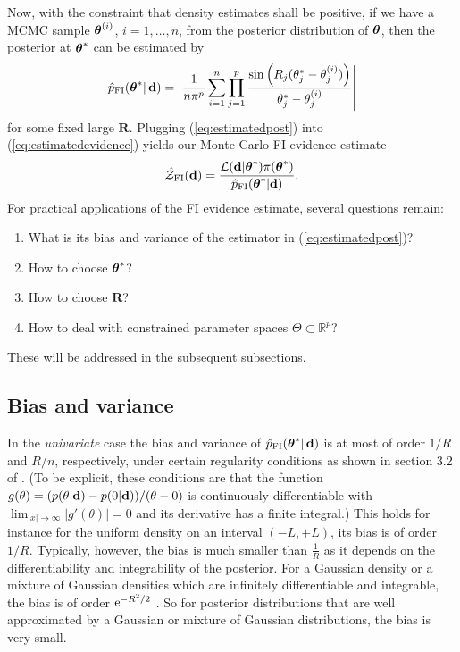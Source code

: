 \documentclass[%
 reprint,
 amsmath,amssymb,
 aps,
]{revtex4-2}
\def\R{\mathbb{R}}
\def\Rbold{\mathbf{R}}
\renewcommand{\d}{{\bf d}}
\newcommand{\btheta}{\mbox{\boldmath $\theta$}}
\newcommand{\e}{{\rm e}}
\begin{document}
Now, with the constraint that density estimates shall be positive, if we have a MCMC sample $\btheta^{(i)}$, $i=1,\ldots,n$, from the posterior distribution of $\btheta$, then the posterior at $\btheta^*$ can be estimated by
\begin{equation}\label{eq:estimatedpost}
\hat{p}_\text{FI}(\btheta^*|\,\d)=\left|\frac{1}{n\pi^p} \sum_{i=1}^n \prod_{j=1}^p\frac{\sin\left(R_j(\theta_j^*-\theta_j^{(i)}) \right)}{\theta_j^*-\theta_j^{(i)}}\right|
\end{equation}
for some fixed large $\Rbold$.
Plugging (\ref{eq:estimatedpost}) into (\ref{eq:estimatedevidence}) yields our Monte Carlo FI evidence estimate
\begin{equation}\label{eq:FIevidence}
 \hat{\mathcal{Z}}_\text{FI}(\d) = \frac{\mathcal{L}(\d|\btheta^*)
 \pi(\btheta^*)}{\hat{p}_\text{FI}(\btheta^*|\d)}.
 \end{equation}
For practical applications of the FI evidence estimate, several questions remain:
\begin{enumerate}
     \item What is its bias and variance of the estimator in (\ref{eq:estimatedpost})?
    \item How to choose $\btheta^*$?
    \item How to choose $\Rbold$?
    \item How to deal with constrained parameter spaces $\Theta \subset \R^p$?
\end{enumerate}
These will be addressed in the subsequent subsections.


\subsection{\label{subsec:FI bias and variance} Bias and variance}
%
 In the {\em univariate} case the bias and variance of $\hat{p}_\text{FI}(\btheta^*|\,\d)$ is at most of order $1/R$ and  $R/n$, respectively, under certain regularity conditions as shown in section 3.2 of \cite{rotiroti2022computing}. (To be explicit, these conditions are that the function $g(\theta)=(p(\theta|\d)-p(0|\d))/(\theta-0)$ is continuously differentiable with $\lim_{|x|\rightarrow \infty} |g'(\theta)|=0$ and its derivative has a finite integral.) This holds for instance for the uniform density on an interval $(-L,+L)$, its bias is of order $1/R$.
Typically, however,  the bias is much smaller than $\frac{1}{R}$ as it depends on the differentiability and integrability of the posterior. For a Gaussian density or a mixture of Gaussian densities which are infinitely differentiable and integrable, the bias is of order $\e^{-R^2/2}$ \cite{rotiroti2022computing}. So for posterior distributions that are well approximated by a Gaussian or mixture of Gaussian distributions, the bias is very small.
\end{document}
